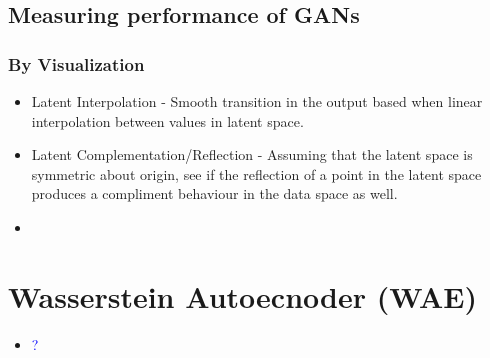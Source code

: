 \documentclass[11pt]{article}
\newcommand{\blue}[1]{\textcolor{blue}{#1}}
\begin{document}
    \subsection{Measuring performance of GANs}

    \subsubsection{By Visualization}
    \begin{itemize}
        \item Latent Interpolation - Smooth transition in the output based when linear interpolation between values in latent space.
        \item Latent Complementation/Reflection - Assuming that the latent space is symmetric about origin, see if the reflection of a point in the latent space produces a compliment behaviour in the data space as well.
        \item
    \end{itemize}


    \section{Wasserstein Autoecnoder (WAE)}
    \begin{itemize}
        \item \blue{?}
    \end{itemize}
\end{document}
